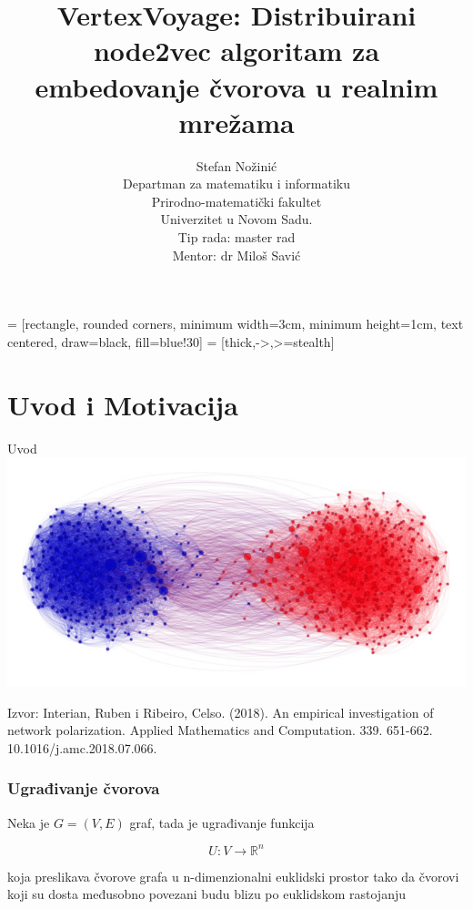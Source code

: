 \documentclass{beamer}
\begin{document}
 = [rectangle, rounded corners, minimum width=3cm, minimum height=1cm, text centered, draw=black, fill=blue!30]
 = [thick,->,>=stealth]

\title{VertexVoyage: Distribuirani node2vec algoritam za embedovanje čvorova u realnim mrežama}
\author{Stefan Nožinić \\
Departman za matematiku i informatiku \\
Prirodno-matematički fakultet \\
Univerzitet u Novom Sadu. \\
Tip rada: master rad \\
Mentor: \MakeLowercase{dr} Miloš Savić
}

\frame{
\titlepage
}

\section{Uvod i Motivacija}
\begin{frame}{Uvod}
    \includegraphics[width=\textwidth]{png/uvod.png}
    \begin{footnotesize}
        Izvor: Interian, Ruben i Ribeiro, Celso. (2018). An empirical investigation of network polarization. Applied Mathematics and Computation. 339. 651-662. 10.1016/j.amc.2018.07.066.
    \end{footnotesize}
\end{frame}

\begin{frame}
	\frametitle{Ugrađivanje čvorova}
	Neka je $ G = (V, E) $ graf, tada je ugrađivanje funkcija 

	$$ U : V \to \mathbb{R}^n $$ 

	koja preslikava čvorove grafa u n-dimenzionalni euklidski prostor tako da čvorovi koji su dosta međusobno povezani budu blizu po euklidskom rastojanju
	

\end{frame}
\end{document}
